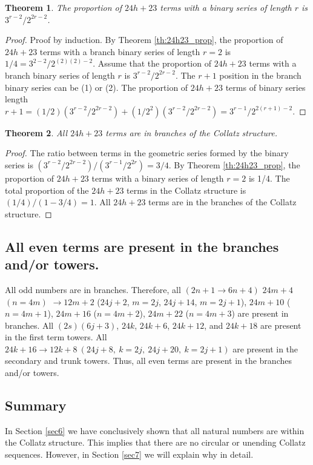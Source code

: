 \documentclass[sn-mathphys-num, pdflatex]{sn-jnl}
\newtheorem{theorem}{Theorem}[section]
\begin{document}
\begin{theorem}
    The proportion of $24h+23$ terms with a binary series of length $r$ is $3^{r-2}/2^{2r-2}$.
\end{theorem}
\begin{proof}
    Proof by induction.
    By Theorem \ref{th:24h23_prop}, the proportion of $24h+23$ terms with a branch binary series of length $r=2$ is $1/4 = 3^{2-2}/2^{(2)(2)-2}$.
    Assume that the proportion of $24h+23$ terms with a branch binary series of length $r$ is $3^{r-2}/2^{2r-2}$.
    The $r+1$ position in the branch binary series can be (1) or (2).
    The proportion of $24h+23$ terms of binary series length $r+1 = (1/2)(3^{r-2}/2^{2r-2})+(1/2^2)(3^{r-2}/2^{2r-2}) = 3^{r-1}/2^{2(r+1)-2}$. 
\end{proof}

\begin{theorem}\label{th:24h23_final}
    All $24h+23$ terms are in branches of the Collatz structure.
\end{theorem}
\begin{proof}
    The ratio between terms in the geometric series formed by the binary series is $(3^{r-2}/2^{2r-2}) / (3^{r-1}/2^{2r}) = 3/4$.
    By Theorem \ref{th:24h23_prop}, the proportion of $24h+23$ terms with a binary series of length $r=2$ is 1/4.
    The total proportion of the $24h+23$ terms in the Collatz structure is $(1/4)/(1 - 3/4) = 1$.
    All $24h+23$ terms are in the branches of the Collatz structure.
\end{proof}

\subsection{All even terms are present in the branches and/or towers.}\label{th6.10}
All odd numbers are in branches. Therefore, all $(2n+1\to 6n+4)$
$24m+4$ $(n = 4m)$ $\to 12m+2$ ($24j+2$, $m=2j$, $24j+14$, $m=2j+1$), $24m+10$ ($n = 4m+1$),
$24m+16$ ($n = 4m+2$), $24m+22$ ($n = 4m+3$) are present in branches.
All $(2s)(6j+3)$, $24k$, $24k+6$, $24k+12$, and $24k+18$ are present in the first term towers.
All $24k+16\to 12k+8\ (24j+8,\ k=2j, \ 24j+20,\ k=2j+1)$ are present in the secondary and trunk towers.
Thus, all even terms are present in the branches and/or towers.

\subsection{Summary}\label{sec6.11}
In Section \ref{sec6} we have conclusively shown that all natural numbers are within the Collatz structure. This implies that there are no circular or unending Collatz sequences. However, in Section \ref{sec7} we will explain why in detail.
\end{document}

